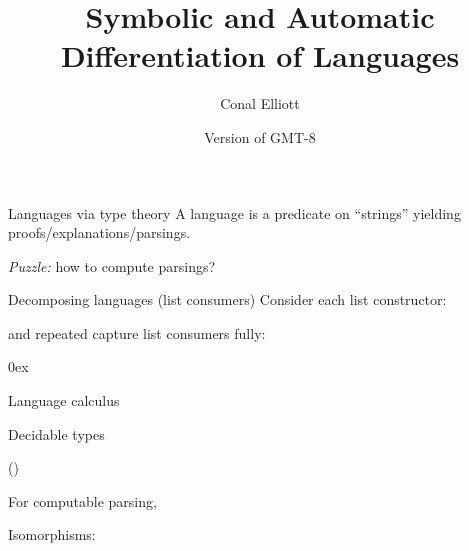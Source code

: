 \documentclass[aspectratio=169]{beamer}
\title{Symbolic and Automatic Differentiation of Languages}
\author{Conal Elliott}
\date{Version of \DTMnow{} GMT-8}
\begin{document}
\begin{center}
\maketitle
{}
\end{center}

\rnc{}

\begin{frame}{Languages via type theory}
\vspace{2.5ex}
A language is a predicate on ``strings'' yielding proofs/explanations/parsings.
\vspace{1ex}


\emph{Puzzle:} how to compute parsings?
\end{frame}

\rnc{}

\begin{frame}{Decomposing languages (list consumers)}
\vspace{2ex}
Consider each list constructor:
\vspace{1.5ex}

\vspace{2ex}
 and repeated  capture list consumers fully:

\vspace{-1ex}
\begin{minipage}[c]{2.8in}
\end{minipage}
\hfill
\begin{minipage}[c]{2.5in}
\mathindent0ex
\end{minipage}
\hfill\;
\end{frame}

\begin{frame}{Language calculus}
\vspace{-1ex}
\vfill
{}
\end{frame}

\rnc{}

\begin{frame}{Decidable types}
\vspace{2ex}
\begin{minipage}{2in}
\end{minipage}
\vspace{1.5ex}
\begin{minipage}{2in}
\vspace{6.3ex}
()
\end{minipage}
\hfill\;

\vspace{1ex}
For computable parsing,

\vspace{2ex}
Isomorphisms:

\end{frame}
\end{document}
